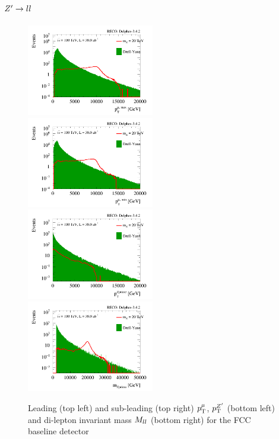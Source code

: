 \documentclass{cernrep}
\begin{document}
\subsection{$Z^{\prime} \rightarrow ll$}
\begin{figure}[!htb]\centering
\includegraphics[width=0.495\textwidth]{Fig/FCC_ptmu_1_sel0_nostack_log.png}
\includegraphics[width=0.495\textwidth]{Fig/FCC_ptmu_2_sel0_nostack_log.png}
\includegraphics[width=0.495\textwidth]{Fig/FCC_ptzp_sel0_nostack_log.png}
\includegraphics[width=0.495\textwidth]{Fig/FCC_mzp_sel0_nostack_log.png}
\caption{Leading (top left) and sub-leading (top right) $p_{\text{T}}^{\mu{}}$, $p_{\text{T}}^{Z^{\prime}}$ (bottom left) and 
di-lepton invariant mass $M_{ll}$ (bottom right) for the FCC 
baseline detector}
\label{fig:zpll_fcc}
\end{figure}
\end{document}
